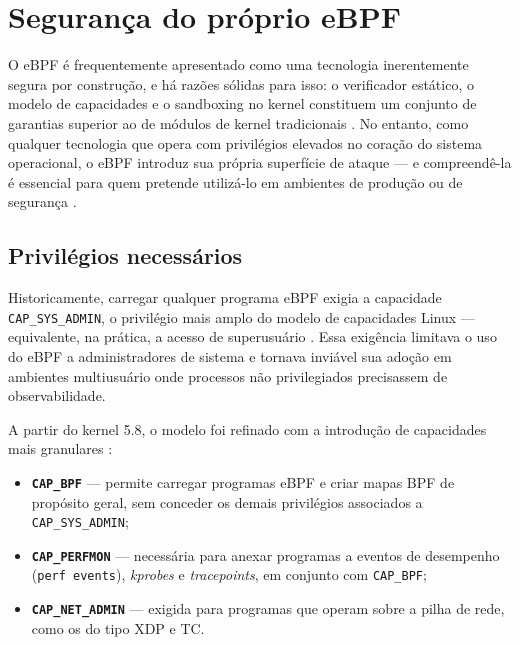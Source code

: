 \chapter{Segurança do próprio eBPF}
\label{cap:seguranca-ebpf}

O eBPF é frequentemente apresentado como uma tecnologia inerentemente segura por
construção, e há razões sólidas para isso: o verificador estático, o modelo de
capacidades e o sandboxing no kernel constituem um conjunto de garantias superior
ao de módulos de kernel tradicionais \cite{linuxkernel2024}.
No entanto, como qualquer tecnologia que opera com privilégios elevados no coração
do sistema operacional, o eBPF introduz sua própria superfície de ataque — e
compreendê-la é essencial para quem pretende utilizá-lo em ambientes de produção
ou de segurança \cite{gregg2019}.

\section{Privilégios necessários}

Historicamente, carregar qualquer programa eBPF exigia a capacidade
\texttt{CAP\_SYS\_ADMIN}, o privilégio mais amplo do modelo de capacidades Linux —
equivalente, na prática, a acesso de superusuário \cite{linuxkernel2024}.
Essa exigência limitava o uso do eBPF a administradores de sistema e tornava
inviável sua adoção em ambientes multiusuário onde processos não privilegiados
precisassem de observabilidade.

A partir do kernel 5.8, o modelo foi refinado com a introdução de capacidades
mais granulares \cite{linuxkernel2024}:

\begin{itemize}
  \item \textbf{\texttt{CAP\_BPF}} — permite carregar programas eBPF e criar
        mapas BPF de propósito geral, sem conceder os demais privilégios
        associados a \texttt{CAP\_SYS\_ADMIN};
  \item \textbf{\texttt{CAP\_PERFMON}} — necessária para anexar programas a
        eventos de desempenho (\texttt{perf events}), \textit{kprobes} e
        \textit{tracepoints}, em conjunto com \texttt{CAP\_BPF};
  \item \textbf{\texttt{CAP\_NET\_ADMIN}} — exigida para programas que operam
        sobre a pilha de rede, como os do tipo XDP e TC.
\end{itemize}

